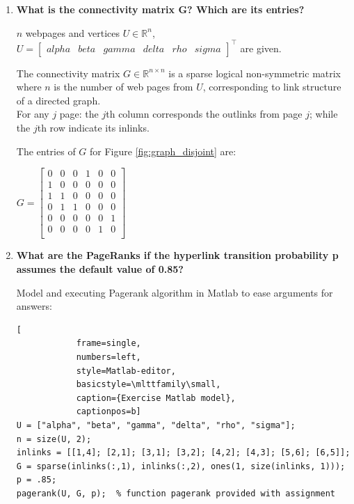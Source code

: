 \documentclass[unicode,11pt,a4paper,oneside,numbers=endperiod,openany]{scrartcl}
\begin{document}
\begin{enumerate}
    \item \textbf{What is the connectivity matrix G? Which are its entries?}

          $n$ webpages and vertices $U \in \mathbb{R}^n$, $U = \begin{bmatrix} alpha & beta & gamma & delta & rho & sigma \end{bmatrix}^\intercal$ are given.

          The connectivity matrix $G \in \mathbb{R}^{n \times n}$ is a sparse logical non-symmetric matrix where $n$ is the number of web pages from $U$, corresponding to link structure of a directed graph. \\
          For any $j$ page: the $j$th column corresponds the outlinks from page $j$;
          while the $j$th row indicate its inlinks.

          The entries of $G$ for Figure \ref{fig:graph_disjoint} are:

          \begin{math}
              G =
              \begin{bmatrix}
                  0 & 0 & 0 & 1 & 0 & 0 \\
                  1 & 0 & 0 & 0 & 0 & 0 \\
                  1 & 1 & 0 & 0 & 0 & 0 \\
                  0 & 1 & 1 & 0 & 0 & 0 \\
                  0 & 0 & 0 & 0 & 0 & 1 \\
                  0 & 0 & 0 & 0 & 1 & 0 \\
              \end{bmatrix}
          \end{math}

    \item \textbf{What are the PageRanks if the hyperlink transition probability p assumes the default value of 0.85?}

          Model and executing Pagerank algorithm in Matlab to ease arguments for answers:

          \begin{lstlisting}[
            frame=single,
            numbers=left,
            style=Matlab-editor,
            basicstyle=\mlttfamily\small,
            caption={Exercise Matlab model},
            captionpos=b]
U = ["alpha", "beta", "gamma", "delta", "rho", "sigma"];
n = size(U, 2);
inlinks = [[1,4]; [2,1]; [3,1]; [3,2]; [4,2]; [4,3]; [5,6]; [6,5]]; 
G = sparse(inlinks(:,1), inlinks(:,2), ones(1, size(inlinks, 1)));
p = .85;
pagerank(U, G, p);  % function pagerank provided with assignment
        \end{lstlisting}


\end{enumerate}
\end{document}
